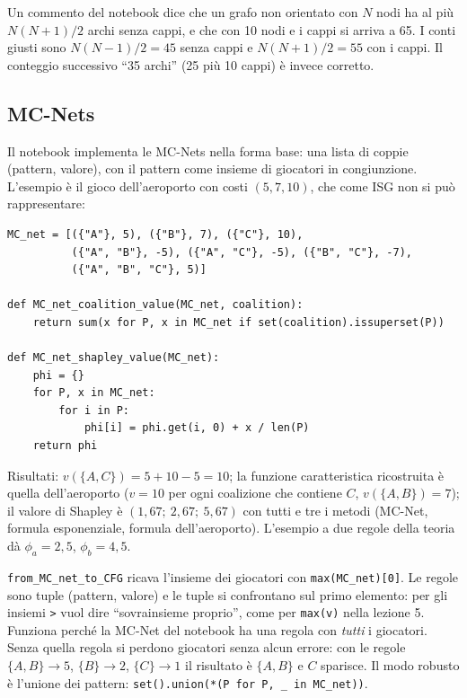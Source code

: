 \begin{attenzione}
Un commento del notebook dice che un grafo non orientato con $N$ nodi ha al più
$N(N+1)/2$ archi senza cappi, e che con 10 nodi e i cappi si arriva a 65. I conti giusti
sono $N(N-1)/2 = 45$ senza cappi e $N(N+1)/2 = 55$ con i cappi. Il conteggio successivo
``35 archi'' (25 più 10 cappi) è invece corretto.
\end{attenzione}

\subsection{MC-Nets}

Il notebook implementa le MC-Nets nella forma base: una lista di coppie (pattern, valore),
con il pattern come insieme di giocatori in congiunzione. L'esempio è il gioco
dell'aeroporto con costi $(5, 7, 10)$, che come ISG non si può rappresentare:
\begin{lstlisting}
MC_net = [({"A"}, 5), ({"B"}, 7), ({"C"}, 10),
          ({"A", "B"}, -5), ({"A", "C"}, -5), ({"B", "C"}, -7),
          ({"A", "B", "C"}, 5)]

def MC_net_coalition_value(MC_net, coalition):
    return sum(x for P, x in MC_net if set(coalition).issuperset(P))

def MC_net_shapley_value(MC_net):
    phi = {}
    for P, x in MC_net:
        for i in P:
            phi[i] = phi.get(i, 0) + x / len(P)
    return phi
\end{lstlisting}
Risultati: $v(\{A, C\}) = 5 + 10 - 5 = 10$; la funzione caratteristica ricostruita è
quella dell'aeroporto ($v = 10$ per ogni coalizione che contiene $C$, $v(\{A,B\}) = 7$);
il valore di Shapley è $(1{,}67;\ 2{,}67;\ 5{,}67)$ con tutti e tre i metodi (MC-Net,
formula esponenziale, formula dell'aeroporto). L'esempio a due regole della teoria dà
$\phi_a = 2{,}5$, $\phi_b = 4{,}5$.

\begin{attenzione}
\texttt{from\_MC\_net\_to\_CFG} ricava l'insieme dei giocatori con
\texttt{max(MC\_net)[0]}. Le regole sono tuple (pattern, valore) e le tuple si confrontano
sul primo elemento: per gli insiemi \texttt{>} vuol dire ``sovrainsieme proprio'', come per
\texttt{max(v)} nella lezione 5. Funziona perché la MC-Net del notebook ha una regola con
\emph{tutti} i giocatori. Senza quella regola si perdono giocatori senza alcun errore: con
le regole $\{A,B\} \to 5$, $\{B\} \to 2$, $\{C\} \to 1$ il risultato è $\{A, B\}$ e $C$
sparisce. Il modo robusto è l'unione dei pattern:
\texttt{set().union(*(P for P, \_ in MC\_net))}.
\end{attenzione}


